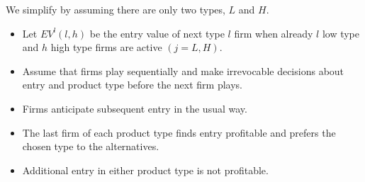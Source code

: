 \documentclass[notes=show]{beamer}
\begin{document}
\begin{frame}%


We simplify by assuming there are only two types, $L$ and $H$.

\begin{itemize}
\item Let $EV^{l}(l,h)$ be the entry value of next type $l$ firm when
already $l$ low type and $h$ high type firms are active $(j=L,H)$.

\item Assume that firms play sequentially and make irrevocable decisions
about entry and product type before the next firm plays.

\item Firms anticipate subsequent entry in the usual way.

\item The last firm of each product type finds entry profitable and prefers
the chosen type to the alternatives.

\item Additional entry in either product type is not profitable.
\end{itemize}

\end{frame}%
\end{document}
